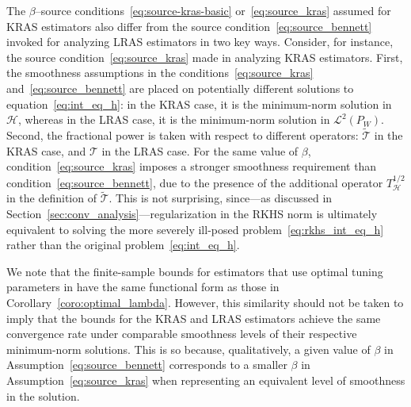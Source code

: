 \documentclass[twoside,11pt]{article}
\newcommand{\mc}{\mathcal}
\begin{document}
The $\beta$--source conditions~\eqref{eq:source-kras-basic} or~\eqref{eq:source_kras} assumed for KRAS estimators also differ from the source condition~\eqref{eq:source_bennett} invoked for analyzing LRAS estimators in two key ways. Consider, for instance, the source condition~\eqref{eq:source_kras} made in analyzing KRAS estimators. First, the smoothness assumptions in the conditions~\eqref{eq:source_kras} and~\eqref{eq:source_bennett} are placed on potentially different solutions to equation~\eqref{eq:int_eq_h}: in the KRAS case, it is the minimum-norm solution in $\mc{H}$, whereas in the LRAS case, it is the minimum-norm solution in $\mc{L}^2(P_W)$. Second, the fractional power is taken with respect to different operators: $\widetilde{\mc{T}}$ in the KRAS case, and $\mc{T}$ in the LRAS case. For the same value of $\beta$, condition~\eqref{eq:source_kras} imposes a stronger smoothness requirement than condition~\eqref{eq:source_bennett}, due to the presence of the additional operator $T_{\mathcal{H}}^{1/2}$ in the definition of $\widetilde{\mathcal{T}}$. This is not surprising, since---as discussed in Section~\ref{sec:conv_analysis}---regularization in the RKHS norm is ultimately equivalent to solving the more severely ill-posed problem~\eqref{eq:rkhs_int_eq_h} rather than the original problem~\eqref{eq:int_eq_h}.

We note that the finite-sample bounds for estimators that use optimal tuning parameters in \citet{bennett2023source} have the same functional form as those in Corollary~\ref{coro:optimal_lambda}. However, this similarity should not be taken to imply that the bounds for the KRAS and LRAS estimators achieve the same convergence rate under comparable smoothness levels of their respective minimum-norm solutions. This is so because, qualitatively, a given value of $\beta$ in Assumption~\eqref{eq:source_bennett} corresponds to a smaller $\beta$ in Assumption~\eqref{eq:source_kras} when representing an equivalent level of smoothness in the solution.
\end{document}

